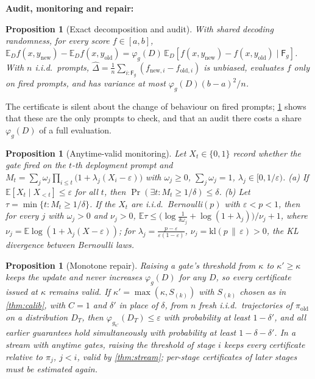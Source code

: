 \documentclass{article}
\theoremstyle{plain}
\newtheorem{proposition}[theorem]{Proposition}
\theoremstyle{definition}
\theoremstyle{remark}
\newcommand{\E}{\mathbb{E}}
\newcommand{\kl}{\mathrm{kl}}
\newcommand{\pold}{\pi_{\mathrm{old}}}
\newcommand{\Fire}{\mathsf{F}}
\begin{document}
\textbf{Audit, monitoring and repair:}

\begin{proposition}[Exact decomposition and audit]
\label{prop:decomp}
With shared decoding randomness, for every score $f\in[a,b]$,
$\E_D f(x,y_{\mathrm{new}})-\E_D f(x,y_{\mathrm{old}})=\varphi_g(D)\,\E_D[f(x,y_{\mathrm{new}})-f(x,y_{\mathrm{old}})
\mid\Fire_g]$. With $n$ i.i.d.\ prompts, $\hat\Delta=\frac1n\sum_{i:\Fire_g}(f_{\mathrm{new},i}-f_{\mathrm{old},i})$
is unbiased, evaluates $f$ only on fired prompts, and has variance at most $\varphi_g(D)(b-a)^2/n$.
\end{proposition}

The certificate is silent about the change of behaviour on fired prompts; \cref{prop:decomp} shows that these
are the only prompts to check, and that an audit there costs a share $\varphi_g(D)$ of a full evaluation.

\begin{proposition}[Anytime-valid monitoring]
\label{prop:monitor}
Let $X_t\in\{0,1\}$ record whether the gate fired on the $t$-th deployment prompt and
$M_t=\sum_j \omega_j\prod_{i\le t}\big(1+\lambda_j(X_i-\varepsilon)\big)$ with $\omega_j\ge0$, $\sum_j\omega_j=1$,
$\lambda_j\in[0,1/\varepsilon)$. (a) If $\E[X_t\mid X_{<t}]\le\varepsilon$ for all $t$, then
$\Pr(\exists t: M_t\ge1/\delta)\le\delta$. (b) Let $\tau=\min\{t:M_t\ge1/\delta\}$. If the $X_t$ are i.i.d.\
Bernoulli$(p)$ with $\varepsilon<p<1$, then for every $j$ with $\omega_j>0$ and $\nu_j>0$,
$\E\tau\le\big(\log\frac{1}{\delta\omega_j}+\log(1+\lambda_j)\big)/\nu_j+1$, where
$\nu_j=\E\log(1+\lambda_j(X-\varepsilon))$; for $\lambda_j=\frac{p-\varepsilon}{\varepsilon(1-\varepsilon)}$,
$\nu_j=\kl(p\,\|\,\varepsilon)>0$, the KL divergence between Bernoulli laws.
\end{proposition}

\begin{proposition}[Monotone repair]
\label{prop:repair}
Raising a gate's threshold from $\kappa$ to $\kappa'\ge\kappa$ keeps the update and never increases
$\varphi_g(D)$ for any $D$, so every certificate issued at $\kappa$ remains valid. If $\kappa'=\max(\kappa,S_{(k)})$
with $S_{(k)}$ chosen as in \cref{thm:calib}, with $C=1$ and $\delta'$ in place of $\delta$, from $n$ fresh
i.i.d.\ trajectories of $\pold$ on a distribution $D_T$, then
$\varphi_{g_{\kappa'}}(D_T)\le\varepsilon$ with probability at least $1-\delta'$, and all earlier guarantees hold
simultaneously with probability at least $1-\delta-\delta'$. In a stream with anytime gates, raising the
threshold of stage $i$ keeps every certificate relative to $\pi_j$, $j<i$, valid by \cref{thm:stream}; per-stage
certificates of later stages must be estimated again.
\end{proposition}
\end{document}
